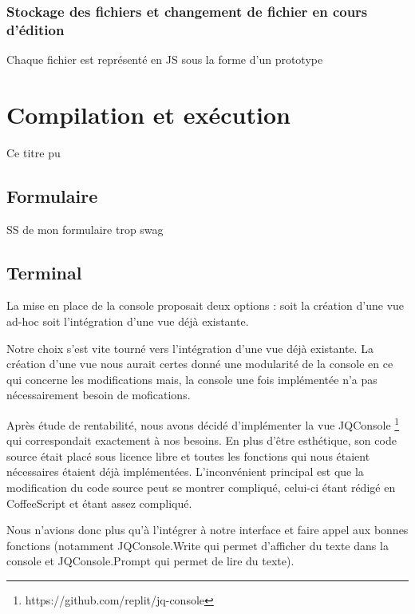 \subsubsection{Stockage des fichiers et changement de fichier en cours d'édition}

Chaque fichier est représenté en JS sous la forme d'un prototype 


\section{Compilation et exécution}
Ce titre pu

\subsection{Formulaire}

SS de mon formulaire trop swag

\subsection{Terminal}

\par La mise en place de la console proposait deux options : soit la création d'une vue ad-hoc soit l'intégration d'une vue déjà existante.

\par Notre choix s'est vite tourné vers l'intégration d'une vue déjà existante. La création d'une vue nous aurait certes donné une modularité de la console en ce qui concerne les modifications mais, la console une fois implémentée n'a pas nécessairement besoin de mofications.

\par Après étude de rentabilité, nous avons décidé d'implémenter la vue JQConsole \footnote{https://github.com/replit/jq-console} qui correspondait exactement à nos besoins. En plus d'être esthétique, son code source était placé sous licence libre et toutes les fonctions qui nous étaient nécessaires étaient déjà implémentées. L'inconvénient principal est que la modification du code source peut se montrer compliqué, celui-ci étant rédigé en CoffeeScript et étant assez compliqué.

\par Nous n'avions donc plus qu'à l'intégrer à notre interface et faire appel aux bonnes fonctions (notamment JQConsole.Write qui permet d'afficher du texte dans la console et JQConsole.Prompt qui permet de lire du texte).
